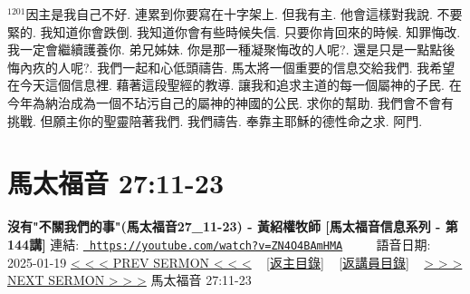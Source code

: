 \documentclass{book}
\begin{document}
$^{1201}$因主是我自己不好.
連累到你要寫在十字架上.
但我有主.
他會這樣對我說.
不要緊的.
我知道你會跌倒.
我知道你會有些時候失信.
只要你肯回來的時候.
知罪悔改.
我一定會繼續護養你.
弟兄姊妹.
你是那一種凝聚悔改的人呢?.
還是只是一點點後悔內疚的人呢?.
我們一起和心低頭禱告.
馬太將一個重要的信息交給我們.
我希望在今天這個信息裡.
藉著這段聖經的教導.
讓我和追求主道的每一個屬神的子民.
在今年為納治成為一個不玷污自己的屬神的神國的公民.
求你的幫助.
我們會不會有挑戰.
但願主你的聖靈陪著我們.
我們禱告.
奉靠主耶穌的德性命之求.
阿門.
\newpage



\section{馬太福音 27:11-23}
\label{sec:ZN4O4BAmHMA}
\textbf{沒有"不關我們的事"(馬太福音27\_11-23) -  黃紹權牧師 [馬太福音信息系列 - 第144講]}
\newline
\newline
連結: \href{https://youtube.com/watch?v=ZN4O4BAmHMA}{\texttt{ https://youtube.com/watch?v=ZN4O4BAmHMA}} ~~~~ 語音日期: 2025-01-19 
\newline
\newline
\hyperref[sec:499K9je19EI]{< < < PREV SERMON < < <}
~
\hyperlink{toc}{[返主目錄]}
~
\hyperref[ch:preacher10]{[返講員目錄]}
~
\hyperref[sec:HaaLhKYBRSg]{> > > NEXT SERMON > > >}
\newline
\newline
馬太福音 27:11-23
\newline
\end{document}
